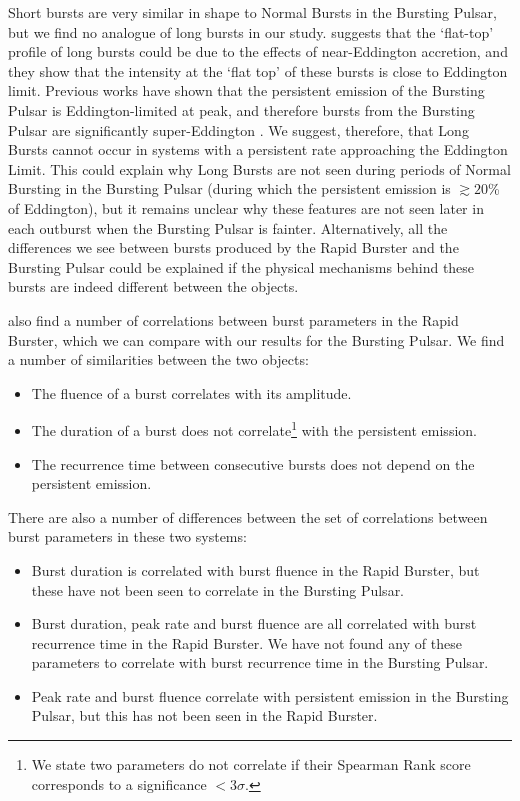 \par Short bursts are very similar in shape to Normal Bursts in the Bursting Pulsar, but we find no analogue of long bursts in our study.  \citet{Bagnoli_PopStudy} suggests that the `flat-top' profile of long bursts could be due to the effects of near-Eddington accretion, and they show that the intensity at the `flat top' of these bursts is close to Eddington limit.  Previous works have shown that the persistent emission of the Bursting Pulsar is Eddington-limited at peak, and therefore bursts from the Bursting Pulsar are significantly super-Eddington \citep{Sazonov_BPGranat}.   We suggest, therefore, that Long Bursts cannot occur in systems with a persistent rate approaching the Eddington Limit.  This could explain why Long Bursts are not seen during periods of Normal Bursting in the Bursting Pulsar (during which the persistent emission is $\gtrsim{20}$\% of Eddington), but it remains unclear why these features are not seen later in each outburst when the Bursting Pulsar is fainter.  Alternatively, all the differences we see between bursts produced by the Rapid Burster and the Bursting Pulsar could be explained if the physical mechanisms behind these bursts are indeed different between the objects.
\par \citet{Bagnoli_PopStudy} also find a number of correlations between burst parameters in the Rapid Burster, which we can compare with our results for the Bursting Pulsar.  We find a number of similarities between the two objects:

\begin{itemize}
\item The fluence of a burst correlates with its amplitude.
\item The duration of a burst does not correlate\footnote{We state two parameters do not correlate if their Spearman Rank score corresponds to a significance $<3\sigma$.} with the persistent emission.
\item The recurrence time between consecutive bursts does not depend on the persistent emission.
 \end{itemize}

\par There are also a number of differences between the set of correlations between burst parameters in these two systems:

\begin{itemize}
\item Burst duration is correlated with burst fluence in the Rapid Burster, but these have not been seen to correlate in the Bursting Pulsar.
\item Burst duration, peak rate and burst fluence are all correlated with burst recurrence time in the Rapid Burster.  We have not found any of these parameters to correlate with burst recurrence time in the Bursting Pulsar.
\item Peak rate and burst fluence correlate with persistent emission in the Bursting Pulsar, but this has not been seen in the Rapid Burster.
\end{itemize}


